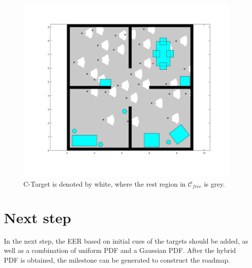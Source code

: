\documentclass[12pt,draftcls,onecolumn]{IEEEtran}
\begin{document}
\begin{figure}
 \centering
  \includegraphics[width=18cm]{figures/CTarget}
  \caption{C-Target is denoted by white, where the rest region in $\mathcal{C}_{free}$ is grey.}
  \label{fig:4}
\end{figure}

\section{Next step} 
In the next step, the EER based on initial cues of the targets should be added, as well as a combination of uniform PDF and a Gaussian PDF.
After the hybrid PDF is obtained, the milestone can be generated to construct the roadmap.
\end{document}
